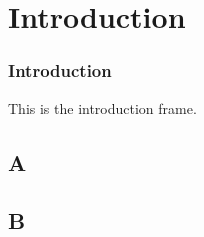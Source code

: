 % 

\section{Introduction}
\begin{frame}\frametitle{Introduction}
    This is the introduction frame.
\end{frame}

\subsection{A}

\subsection{B}
%
\endinput  %
